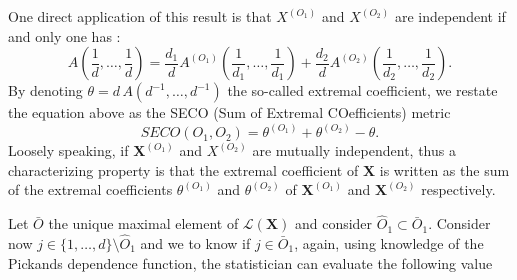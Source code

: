 \documentclass[11pt]{article}
\begin{document}
	  One direct application of this result is that $X^{(O_1)}$ and $X^{(O_2)}$ are independent if and only one has :
	\begin{equation*}
		A\left(\frac{1}{d}, \dots, \frac{1}{d}\right) = \frac{d_1}{d} A^{(O_1)}\left( \frac{1}{d_1}, \dots, \frac{1}{d_1} \right) + \frac{d_2}{d} A^{(O_2)}\left( \frac{1}{d_2}, \dots, \frac{1}{d_2} \right).
	\end{equation*}
	By denoting $\theta = d \, A (d^{-1}, \dots, d^{-1})$ the so-called extremal coefficient, we restate the equation above as the SECO (Sum of Extremal COefficients) metric
	\begin{equation}
		SECO(O_1, O_2) = \theta^{(O_1)} + \theta^{(O_2)} - \theta.
	\end{equation}
	Loosely speaking, if $\textbf{X}^{(O_1)}$ and $X^{(O_2)}$ are mutually independent, thus a characterizing property is that the extremal coefficient of $\textbf{X}$ is written as the sum of the extremal coefficients $\theta^{(O_1)}$ and $\theta^{(O_2)}$ of $\textbf{X}^{(O_1)}$ and $\textbf{X}^{(O_2)}$ respectively.
	
	Let $\bar{O}$ the unique maximal element of $\mathcal{L}(\textbf{X})$ and consider $\hat{O}_1 \subset \bar{O}_1$. Consider now $j \in \{1,\dots,d\} \setminus \hat{O}_1$ and we to know if $j \in \bar{O}_1$, again, using knowledge of the Pickands dependence function, the statistician can evaluate the following value
	
\end{document}
